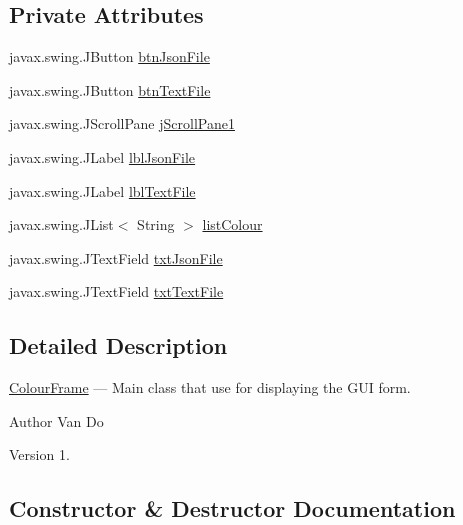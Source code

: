\subsection*{Private Attributes}
\begin{DoxyCompactItemize}
\item 
javax.\+swing.\+J\+Button \hyperlink{classcolours_1_1_colour_frame_a1fe23149a50772dff538d0004e7cb1ee}{btn\+Json\+File}
\item 
javax.\+swing.\+J\+Button \hyperlink{classcolours_1_1_colour_frame_aeca940071b6ad635188894ab1be05658}{btn\+Text\+File}
\item 
javax.\+swing.\+J\+Scroll\+Pane \hyperlink{classcolours_1_1_colour_frame_a13f0c92b9066a68b8ab31cdc346e12e2}{j\+Scroll\+Pane1}
\item 
javax.\+swing.\+J\+Label \hyperlink{classcolours_1_1_colour_frame_a3465e8e9a196ae2a3249b5212e954594}{lbl\+Json\+File}
\item 
javax.\+swing.\+J\+Label \hyperlink{classcolours_1_1_colour_frame_a89795e4433199461d0c29f8f2af8e35f}{lbl\+Text\+File}
\item 
javax.\+swing.\+J\+List$<$ String $>$ \hyperlink{classcolours_1_1_colour_frame_a9c6b0ac09f52427530bd1e0fbc285cc2}{list\+Colour}
\item 
javax.\+swing.\+J\+Text\+Field \hyperlink{classcolours_1_1_colour_frame_adaffa1254ad772940748d49324e191a0}{txt\+Json\+File}
\item 
javax.\+swing.\+J\+Text\+Field \hyperlink{classcolours_1_1_colour_frame_a8acb908d5dbadca9e110960051340977}{txt\+Text\+File}
\end{DoxyCompactItemize}


\subsection{Detailed Description}
\hyperlink{classcolours_1_1_colour_frame}{Colour\+Frame} --- Main class that use for displaying the G\+UI form. \begin{DoxyAuthor}{Author}
Van Do 
\end{DoxyAuthor}
\begin{DoxyVersion}{Version}
1. 
\end{DoxyVersion}


\subsection{Constructor \& Destructor Documentation}
\mbox{\label{classcolours_1_1_colour_frame_ab7b3858b7fb97ff26bf7534c1767270c}} 
